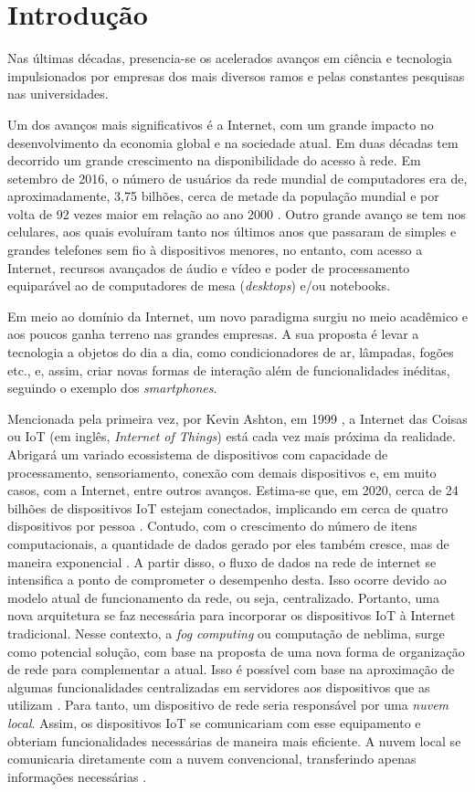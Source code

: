 \chapter{Introdução}

Nas últimas décadas, presencia-se os acelerados avanços em ciência e tecnologia impulsionados por empresas dos mais diversos ramos e pelas constantes pesquisas nas universidades. 

Um dos avanços mais significativos é a Internet, com um grande impacto no desenvolvimento da economia global e na sociedade atual. Em duas décadas tem decorrido um grande crescimento na disponibilidade do acesso à rede. Em setembro de 2016, o número de usuários da rede mundial de computadores era de, aproximadamente, 3,75 bilhões, cerca de metade da população mundial e por volta de 92 vezes maior em relação ao ano 2000 \cite{MiniwattsMarketingGroup2016}.  Outro grande avanço se tem nos celulares, aos quais evoluíram tanto nos últimos anos que passaram de simples e grandes telefones sem fio à dispositivos menores, no entanto, com acesso a Internet, recursos avançados de áudio e vídeo e poder de processamento equiparável ao de computadores de mesa (\textit{desktops}) e/ou notebooks.

Em meio ao domínio da Internet, um novo paradigma surgiu no meio acadêmico e aos poucos ganha terreno nas grandes empresas. A sua proposta é levar a tecnologia a objetos do dia a dia, como condicionadores de ar, lâmpadas, fogões etc., e, assim, criar novas formas de interação além de funcionalidades inéditas, seguindo o exemplo dos \textit{smartphones}. 

Mencionada pela primeira vez, por Kevin Ashton, em 1999 \cite{Finep2015}, a Internet das Coisas ou IoT (em inglês, \textit{Internet of Things}) está cada vez mais próxima da realidade. Abrigará um variado ecossistema de dispositivos com capacidade de processamento, sensoriamento, conexão com demais dispositivos e, em muito casos, com a Internet, entre outros avanços. Estima-se que, em 2020, cerca de 24 bilhões de dispositivos IoT estejam conectados, implicando em cerca de quatro dispositivos por pessoa \cite{Meola2016}.   
Contudo, com o crescimento do número de itens computacionais, a quantidade de dados gerado por eles também cresce, mas de maneira exponencial \cite{Chiang2016}. A partir disso, o fluxo de dados na rede de internet se intensifica a ponto de comprometer o desempenho desta. Isso ocorre devido ao modelo atual de funcionamento da rede, ou seja, centralizado. Portanto, uma nova arquitetura se faz necessária para incorporar os dispositivos IoT à Internet tradicional. %
Nesse contexto, a \textit{fog computing} ou computação de neblima, surge como potencial solução, com base na proposta de uma nova forma de organização de rede para complementar a atual. Isso é possível com base na aproximação de algumas funcionalidades centralizadas em servidores aos dispositivos que as utilizam \cite{Chiang2016}. Para tanto, um dispositivo de rede seria responsável por uma \textit{nuvem local}. Assim, os dispositivos IoT se comunicariam com esse equipamento e obteriam funcionalidades necessárias de maneira mais eficiente. A nuvem local se comunicaria diretamente com a nuvem convencional, transferindo apenas informações necessárias \cite{Syed2016}.


